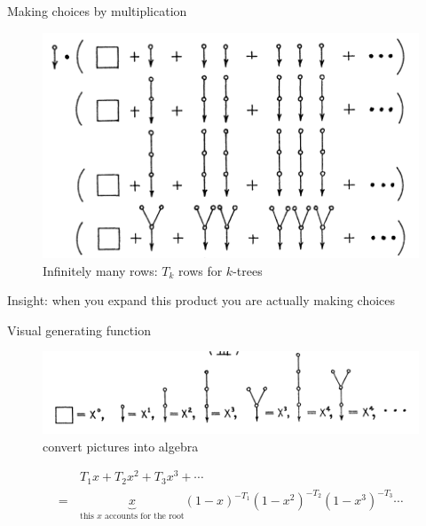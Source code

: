 \documentclass{beamer}
\begin{document}
    \begin{frame}{Making choices by multiplication}
        \begin{figure}
            \centering
            \includegraphics[scale=0.5]{images/tree3.png}
            \caption{Infinitely many rows: $T_k$ rows for $k$-trees}
            \label{fig:enter-label}
        \end{figure}
        Insight: when you expand this product you are actually making choices
    \end{frame}

    \begin{frame}{Visual generating function}
        \begin{figure}
            \centering
            \includegraphics[scale=0.6]{images/tree5.png}
            \caption{convert pictures into algebra}
            \label{fig:enter-label}
        \end{figure}
    \begin{align*}
        & T_1x + T_2 x^2 + T_3 x^3 +\cdots \\
        =\,  & \underbrace{x}_{\text{this $x$ accounts for the root}}(1-x)^{-T_1}(1-x^2)^{-T_2}(1-x^3)^{-T_3}\cdots
    \end{align*}
    \end{frame}
\end{document}
